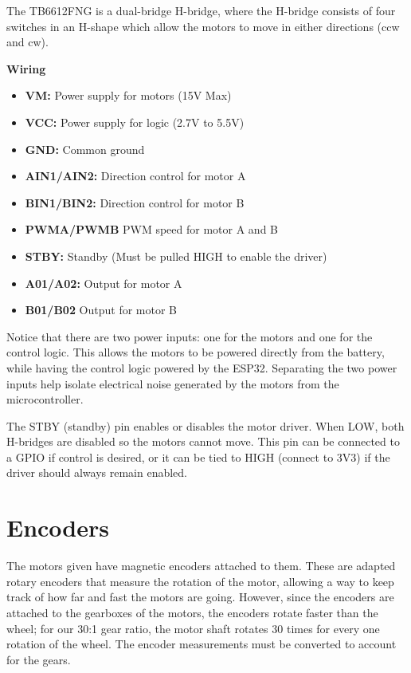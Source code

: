 \documentclass[11pt]{report}
\begin{document}
	\noindent
 	The TB6612FNG is a dual-bridge H-bridge, where the H-bridge consists of four switches in an H-shape 
	which allow the motors to move in either directions (ccw and cw). 
	\newline

	\noindent
	\textbf{Wiring}
	\begin{itemize}
		\item \textbf{VM:} Power supply for motors (15V Max)
		\item \textbf{VCC:} Power supply for logic (2.7V to 5.5V)
		\item \textbf{GND:} Common ground
		\item \textbf{AIN1/AIN2:} Direction control for motor A
		\item \textbf{BIN1/BIN2:} Direction control for motor B
		\item \textbf{PWMA/PWMB} PWM speed for motor A and B 
		\item \textbf{STBY:} Standby (Must be pulled HIGH to enable the driver)
		\item \textbf{A01/A02:} Output for motor A
		\item \textbf{B01/B02} Output for motor B
	\end{itemize}

	\noindent
	Notice that there are two power inputs: one for the motors and one for the control logic. This allows 
	the motors to be powered directly from the battery, while having the control logic powered by the ESP32. 
	Separating the two power inputs help isolate electrical noise generated by the motors from the 
	microcontroller.
	\newline

	\noindent
	The STBY (standby) pin enables or disables the motor driver. When LOW, both H-bridges are disabled so 
	the motors cannot move. This pin can be connected to a GPIO if control is desired, or it can be 
	tied to HIGH (connect to 3V3) if the driver should always remain enabled.  

	\newpage

    \section{Encoders} \label{sec:encoders}
	The motors given have magnetic encoders attached to them. These are adapted rotary encoders that measure the rotation
	of the motor, allowing a way to keep track of how far and fast the motors are going. However, since the encoders are 
	attached to the gearboxes of the motors, the encoders rotate faster than the wheel; for our 30:1 gear ratio, the motor 
	shaft rotates 30 times for every one rotation of the wheel. The encoder measurements must be converted to 
	account for the gears. 
\end{document}
